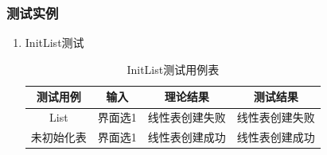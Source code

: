 \documentclass[supercite]{HustGraduPaper}
\theoremstyle{definition}
\begin{document}
\subsubsection{测试实例}
\begin{enumerate}
	\item InitList测试
	      \begin{table}[htb]
		      \begin{center}
			      \setlength{\tabcolsep}{2.0mm}
			      \caption{InitList测试用例表}
			      \label{table12}
			      \begin{tabular}{|c|c|c|c|}
				      \hline
				      测试用例   & 输入    & 理论结果       & 测试结果       \\
				      \hline
				      \hline
				      List       & 界面选1 & 线性表创建失败 & 线性表创建失败 \\
				      \hline
				      未初始化表 & 界面选1 & 线性表创建成功 & 线性表创建成功 \\
				      \hline
			      \end{tabular}
		      \end{center}
	      \end{table}
	      \begin{figure}[htb]
		      \centering
		      \quad
		      \\

\end{figure}
\end{enumerate}
\end{document}
